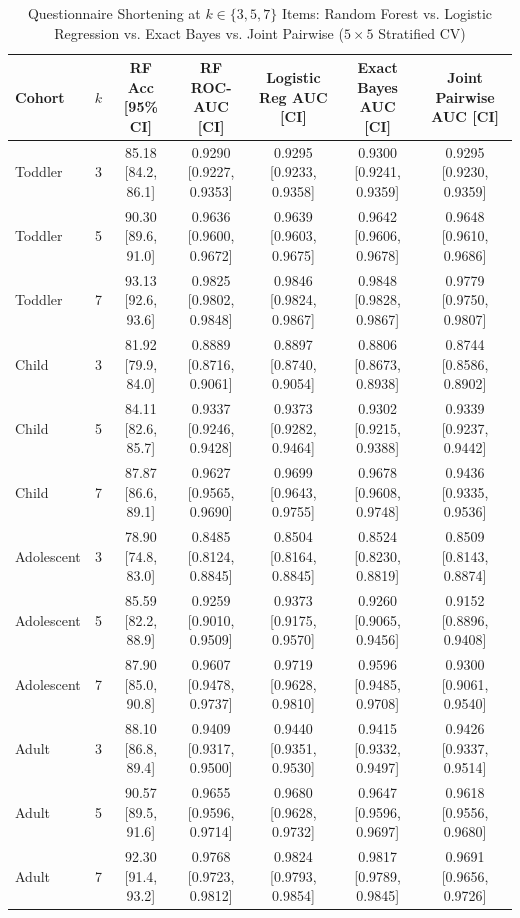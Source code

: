 \begin{table}[t]
\centering
\caption{Questionnaire Shortening at $k \in \{3, 5, 7\}$ Items: Random Forest vs. Logistic Regression vs. Exact Bayes vs. Joint Pairwise ($5\times 5$ Stratified CV)}
\label{tab:shortening}
\footnotesize
\setlength{\tabcolsep}{3pt}
\begin{tabular*}{\textwidth}{|@{\extracolsep{\fill}}l|c|c|c|c|c|c|}
\hline
\textbf{Cohort} & $k$ & \textbf{RF Acc [95\% CI]} & \textbf{RF ROC-AUC [CI]} & \textbf{Logistic Reg AUC [CI]} & \textbf{Exact Bayes AUC [CI]} & \textbf{Joint Pairwise AUC [CI]} \\
\hline
Toddler & 3 & 85.18 [84.2, 86.1] & 0.9290 [0.9227, 0.9353] & 0.9295 [0.9233, 0.9358] & 0.9300 [0.9241, 0.9359] & 0.9295 [0.9230, 0.9359] \\
\hline
Toddler & 5 & 90.30 [89.6, 91.0] & 0.9636 [0.9600, 0.9672] & 0.9639 [0.9603, 0.9675] & 0.9642 [0.9606, 0.9678] & 0.9648 [0.9610, 0.9686] \\
\hline
Toddler & 7 & 93.13 [92.6, 93.6] & 0.9825 [0.9802, 0.9848] & 0.9846 [0.9824, 0.9867] & 0.9848 [0.9828, 0.9867] & 0.9779 [0.9750, 0.9807] \\
\hline
Child & 3 & 81.92 [79.9, 84.0] & 0.8889 [0.8716, 0.9061] & 0.8897 [0.8740, 0.9054] & 0.8806 [0.8673, 0.8938] & 0.8744 [0.8586, 0.8902] \\
\hline
Child & 5 & 84.11 [82.6, 85.7] & 0.9337 [0.9246, 0.9428] & 0.9373 [0.9282, 0.9464] & 0.9302 [0.9215, 0.9388] & 0.9339 [0.9237, 0.9442] \\
\hline
Child & 7 & 87.87 [86.6, 89.1] & 0.9627 [0.9565, 0.9690] & 0.9699 [0.9643, 0.9755] & 0.9678 [0.9608, 0.9748] & 0.9436 [0.9335, 0.9536] \\
\hline
Adolescent & 3 & 78.90 [74.8, 83.0] & 0.8485 [0.8124, 0.8845] & 0.8504 [0.8164, 0.8845] & 0.8524 [0.8230, 0.8819] & 0.8509 [0.8143, 0.8874] \\
\hline
Adolescent & 5 & 85.59 [82.2, 88.9] & 0.9259 [0.9010, 0.9509] & 0.9373 [0.9175, 0.9570] & 0.9260 [0.9065, 0.9456] & 0.9152 [0.8896, 0.9408] \\
\hline
Adolescent & 7 & 87.90 [85.0, 90.8] & 0.9607 [0.9478, 0.9737] & 0.9719 [0.9628, 0.9810] & 0.9596 [0.9485, 0.9708] & 0.9300 [0.9061, 0.9540] \\
\hline
Adult & 3 & 88.10 [86.8, 89.4] & 0.9409 [0.9317, 0.9500] & 0.9440 [0.9351, 0.9530] & 0.9415 [0.9332, 0.9497] & 0.9426 [0.9337, 0.9514] \\
\hline
Adult & 5 & 90.57 [89.5, 91.6] & 0.9655 [0.9596, 0.9714] & 0.9680 [0.9628, 0.9732] & 0.9647 [0.9596, 0.9697] & 0.9618 [0.9556, 0.9680] \\
\hline
Adult & 7 & 92.30 [91.4, 93.2] & 0.9768 [0.9723, 0.9812] & 0.9824 [0.9793, 0.9854] & 0.9817 [0.9789, 0.9845] & 0.9691 [0.9656, 0.9726] \\
\hline
\end{tabular*}
\vspace{-2mm}
\end{table}

